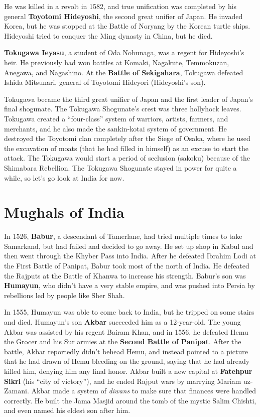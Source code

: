 He was killed in a revolt in 1582,
and true unification was completed by his general \textbf{Toyotomi Hideyoshi},
the second great unifier of Japan.
He invaded Korea, but he was stopped at the Battle of Noryang by the Korean turtle ships.
Hideyoshi tried to conquer the Ming dynasty in China, but he died.

\textbf{Tokugawa Ieyasu}, a student of Oda Nobunaga, was a regent for Hideyoshi's heir.
He previously had won battles at Komaki, Nagakute, Temmokuzan, Anegawa, and Nagashino.
At the \textbf{Battle of Sekigahara}, Tokugawa defeated Ishida Mitsunari,
general of Toyotomi Hideyori (Hideyoshi's son).

Tokugawa became the third great unifier of Japan and the first leader of Japan's final shogunate.
The Tokugawa Shogunate's crest was three hollyhock leaves.
Tokugawa created a ``four-class'' system of warriors, artists, farmers, and merchants,
and he also made the sankin-kotai system of government.
He destroyed the Toyotomi clan completely after the Siege of Osaka,
where he used the excavation of moats (that he had filled in himself) as an excuse to start the attack.
The Tokugawa would start a period of seclusion (sakoku) because of the Shimabara Rebellion.
The Tokugawa Shogunate stayed in power for quite a while, so let's go look at India for now.

\section{Mughals of India}

In 1526, \textbf{Babur}, a descendant of Tamerlane,
had tried multiple times to take Samarkand, but had failed and decided to go away.
He set up shop in Kabul and then went through the Khyber Pass into India.
After he defeated Ibrahim Lodi at the First Battle of Panipat, Babur took most of the north of India.
He defeated the Rajputs at the Battle of Khanwa to increase his strength.
Babur's son was \textbf{Humayun}, who didn't have a very stable empire,
and was pushed into Persia by rebellions led by people like Sher Shah.

In 1555, Humayun was able to come back to India, but he tripped on some stairs and died.
Humayun's son \textbf{Akbar} succeeded him as a 12-year-old.
The young Akbar was assisted by his regent Bairam Khan,
and in 1556, he defeated Hemu the Grocer and his Sur armies at the \textbf{Second Battle of Panipat}.
After the battle, Akbar reportedly didn't behead Hemu,
and instead pointed to a picture that he had drawn of Hemu bleeding on the ground,
saying that he had already killed him, denying him any final honor.
Akbar built a new capital at \textbf{Fatehpur Sikri} (his ``city of victory''),
and he ended Rajput wars by marrying Mariam uz-Zamani.
Akbar made a system of \textit{diwans} to make sure that finances were handled correctly.
He built the Jama Masjid around the tomb of the mystic Salim Chishti,
and even named his eldest son after him.

